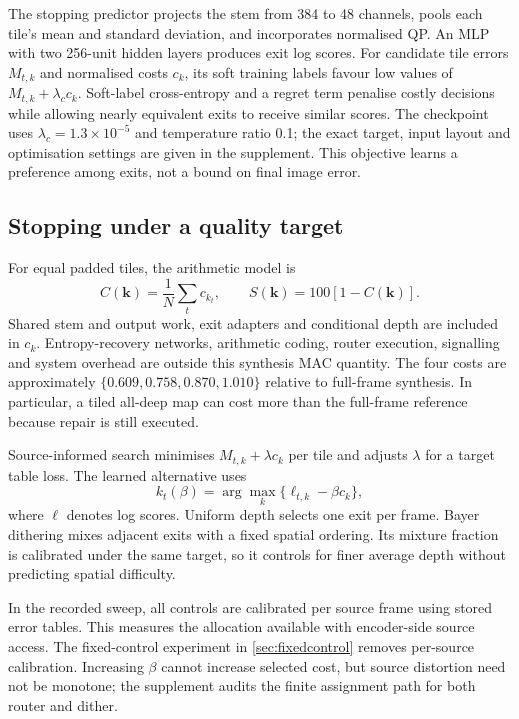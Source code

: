 The stopping predictor projects the stem from 384 to 48 channels,
pools each tile's mean and standard deviation, and incorporates normalised
QP. An MLP with two 256-unit hidden layers produces exit log scores.
For candidate tile errors $M_{t,k}$ and normalised costs $c_k$, its soft
training labels favour low values of $M_{t,k}+\lambda_c c_k$.
Soft-label cross-entropy and a regret term penalise costly decisions while
allowing nearly equivalent exits to receive similar scores. The checkpoint
uses $\lambda_c=1.3\times10^{-5}$ and temperature ratio 0.1; the exact target,
input layout and optimisation settings are given in the supplement.
This objective learns a preference among exits, not a bound on final image
error.

\subsection{Stopping under a quality target}

For equal padded tiles, the arithmetic model is
\begin{equation}
 C(\mathbf k)=\frac1N\sum_t c_{k_t},\qquad
 S(\mathbf k)=100[1-C(\mathbf k)].
 \label{eq:cost}
\end{equation}
Shared stem and output work, exit adapters and conditional depth are included
in $c_k$. Entropy-recovery networks, arithmetic coding, router execution,
signalling and system overhead are outside this synthesis MAC quantity.
The four costs are approximately
$\{0.609,0.758,0.870,1.010\}$ relative to full-frame synthesis. In particular,
a tiled all-deep map can cost more than the full-frame reference because repair
is still executed.

Source-informed search minimises $M_{t,k}+\lambda c_k$ per tile and adjusts
$\lambda$ for a target table loss. The learned alternative uses
\begin{equation}
 k_t(\beta)=\arg\max_k\{\ell_{t,k}-\beta c_k\},
 \label{eq:router}
\end{equation}
where $\ell$ denotes log scores. Uniform depth selects one exit per frame.
Bayer dithering mixes adjacent exits with a fixed spatial ordering. Its
mixture fraction is calibrated under the same target, so it controls for
finer average depth without predicting spatial difficulty.

In the recorded sweep, all controls are calibrated per source frame using
stored error tables. This measures the allocation available with encoder-side source access.
The fixed-control experiment in \cref{sec:fixedcontrol} removes per-source
calibration. Increasing $\beta$ cannot increase selected
cost, but source distortion need not be monotone; the supplement audits the
finite assignment path for both router and dither.

